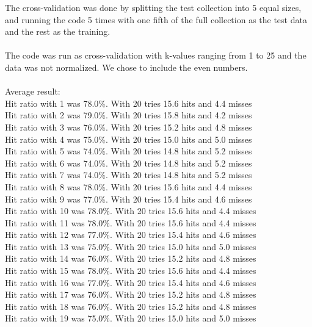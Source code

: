 \documentclass{article}
\begin{document}
The cross-validation was done by splitting the test collection into
5 equal sizes, and running the code 5 times with one fifth of the full
collection as the test data and the rest as the training.\\\\ The code
was run as cross-validation with k-values ranging from 1 to 25 and the
data was not normalized. We chose to include the even numbers.\\\\
Average result:\\ 
Hit ratio with 1 was   78.0\%. With 20 tries 15.6 hits and 4.4 misses\\
Hit ratio with 2 was   79.0\%. With 20 tries 15.8 hits and 4.2 misses\\
Hit ratio with 3 was   76.0\%. With 20 tries 15.2 hits and 4.8 misses\\
Hit ratio with 4 was   75.0\%. With 20 tries 15.0 hits and 5.0 misses\\
Hit ratio with 5 was   74.0\%. With 20 tries 14.8 hits and 5.2 misses\\
Hit ratio with 6 was   74.0\%. With 20 tries 14.8 hits and 5.2 misses\\
Hit ratio with 7 was   74.0\%. With 20 tries 14.8 hits and 5.2 misses\\
Hit ratio with 8 was   78.0\%. With 20 tries 15.6 hits and 4.4 misses\\
Hit ratio with 9 was   77.0\%. With 20 tries 15.4 hits and 4.6 misses\\
Hit ratio with 10 was  78.0\%. With 20 tries 15.6 hits and 4.4 misses\\
Hit ratio with 11 was  78.0\%. With 20 tries 15.6 hits and 4.4 misses\\
Hit ratio with 12 was  77.0\%. With 20 tries 15.4 hits and 4.6 misses\\
Hit ratio with 13 was  75.0\%. With 20 tries 15.0 hits and 5.0 misses\\
Hit ratio with 14 was  76.0\%. With 20 tries 15.2 hits and 4.8 misses\\
Hit ratio with 15 was  78.0\%. With 20 tries 15.6 hits and 4.4 misses\\
Hit ratio with 16 was  77.0\%. With 20 tries 15.4 hits and 4.6 misses\\
Hit ratio with 17 was  76.0\%. With 20 tries 15.2 hits and 4.8 misses\\
Hit ratio with 18 was  76.0\%. With 20 tries 15.2 hits and 4.8 misses\\
Hit ratio with 19 was  75.0\%. With 20 tries 15.0 hits and 5.0 misses\\
\end{document}
